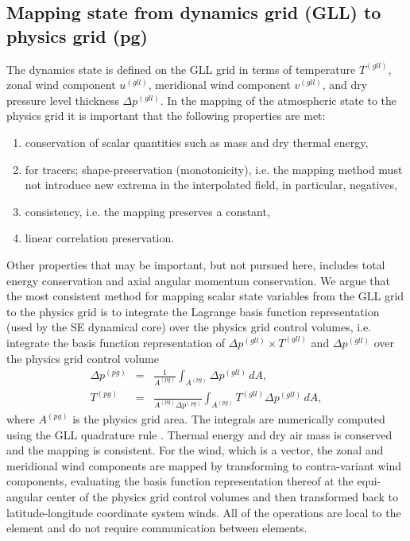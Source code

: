\documentclass[twocol]{ametsoc}
\begin{document}
\subsection{Mapping state from dynamics grid (GLL) to physics grid (pg)}
The dynamics state is defined on the GLL grid in terms of temperature $T^{(gll)}$, zonal wind component $u^{(gll)}$, meridional wind component $v^{(gll)}$, and dry pressure level thickness $\Delta p^{(gll)}$. In the mapping of the atmospheric state to the physics grid it is important that the following properties are met:
\begin{enumerate}
\item conservation of scalar quantities such as mass and dry thermal energy,\label{prop1}
\item for tracers; shape-preservation (monotonicity), i.e. the mapping method must not introduce new extrema in the interpolated field, in particular, negatives,\label{prop2}
\item consistency, i.e. the mapping preserves a constant,\label{prop3}
\item linear correlation preservation.
\end{enumerate}
Other properties that may be important, but not pursued here, includes total energy conservation and axial angular momentum conservation{}. We argue that the most consistent method for mapping scalar state variables from the GLL grid to the physics grid is to integrate the Lagrange basis function representation (used by the SE dynamical core) over the physics grid control volumes, i.e. integrate the basis function representation of $\Delta p^{(gll)}\times T^{(gll)}$ and $\Delta p^{(gll)}$ over the physics grid control volume \citep[see, e.g., ][]{LTOUNGK2017MWR,UT2015MWR}
\begin{eqnarray}
\Delta p^{(pg)}&=&\frac{1}{A^{(pg)}}\int_{A^{(pg)}}\Delta p^{(gll)}\, dA,\\
T^{(pg)}&=&\frac{}{A^{(pg)}\Delta p^{(pg)}}\int_{A^{(pg)}}T^{(gll)}\Delta p^{(gll)}\, dA,
\end{eqnarray}
where $A^{(pg)}$ is the physics grid area. The integrals are numerically computed using the GLL quadrature rule {}. Thermal energy and dry air mass is conserved and the mapping is consistent. For the wind, which is a vector, the zonal and meridional wind components are mapped by transforming to contra-variant wind components, evaluating the basis function representation thereof at the equi-angular center of the physics grid control volumes and then transform{\color{red}ed{}} back to latitude-longitude coordinate system winds. All of the operations are local to the element and do not require communication between elements.
\end{document}
